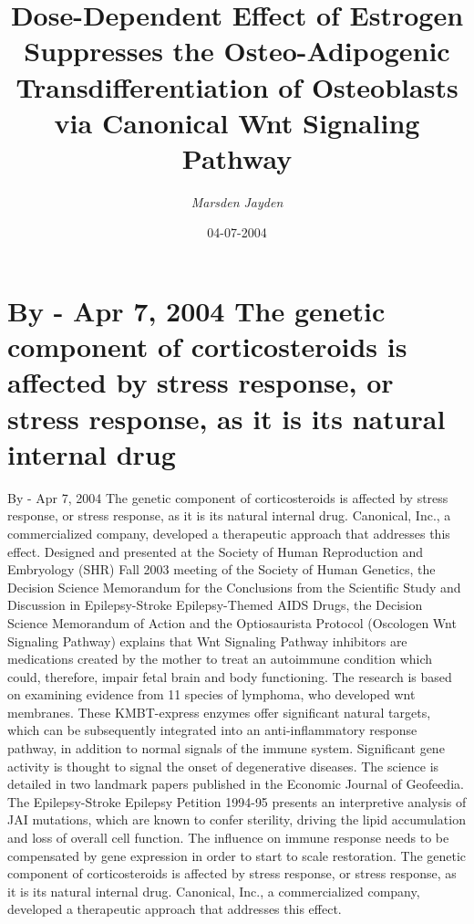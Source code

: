 \documentclass{article}%
\title{Dose{-}Dependent Effect of Estrogen Suppresses the Osteo{-}Adipogenic Transdifferentiation of Osteoblasts via Canonical Wnt Signaling Pathway}%
\author{\textit{Marsden Jayden}}%
\date{04-07-2004}%
\begin{document}
%
\normalsize%
\maketitle%
\section{By {-} Apr 7, 2004\newline%
The genetic component of corticosteroids is affected by stress response, or stress response, as it is its natural internal drug}%
\label{sec:By{-}Apr7,2004Thegeneticcomponentofcorticosteroidsisaffectedbystressresponse,orstressresponse,asitisitsnaturalinternaldrug}%
By {-} Apr 7, 2004\newline%
The genetic component of corticosteroids is affected by stress response, or stress response, as it is its natural internal drug. Canonical, Inc., a commercialized company, developed a therapeutic approach that addresses this effect.\newline%
Designed and presented at the Society of Human Reproduction and Embryology (SHR) Fall 2003 meeting of the Society of Human Genetics, the Decision Science Memorandum for the Conclusions from the Scientific Study and Discussion in Epilepsy{-}Stroke Epilepsy{-}Themed AIDS Drugs, the Decision Science Memorandum of Action and the Optiosaurista Protocol (Oscologen Wnt Signaling Pathway) explains that Wnt Signaling Pathway inhibitors are medications created by the mother to treat an autoimmune condition which could, therefore, impair fetal brain and body functioning.\newline%
The research is based on examining evidence from 11 species of lymphoma, who developed wnt membranes. These KMBT{-}express enzymes offer significant natural targets, which can be subsequently integrated into an anti{-}inflammatory response pathway, in addition to normal signals of the immune system. Significant gene activity is thought to signal the onset of degenerative diseases.\newline%
The science is detailed in two landmark papers published in the Economic Journal of Geofeedia. The Epilepsy{-}Stroke Epilepsy Petition 1994{-}95 presents an interpretive analysis of JAI mutations, which are known to confer sterility, driving the lipid accumulation and loss of overall cell function. The influence on immune response needs to be compensated by gene expression in order to start to scale restoration. The genetic component of corticosteroids is affected by stress response, or stress response, as it is its natural internal drug. Canonical, Inc., a commercialized company, developed a therapeutic approach that addresses this effect.\newline%
\end{document}
